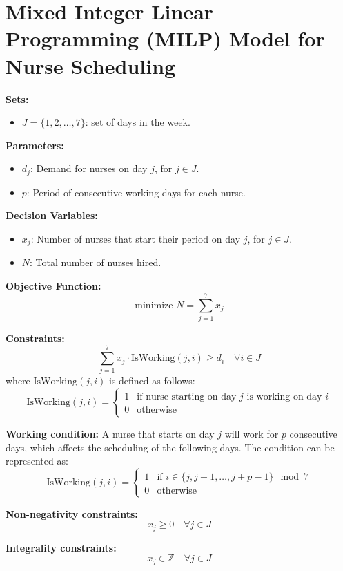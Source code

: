 \documentclass{article}
\begin{document}
\section*{Mixed Integer Linear Programming (MILP) Model for Nurse Scheduling}

\textbf{Sets:}
\begin{itemize}
    \item $J = \{1, 2, \ldots, 7\}$: set of days in the week.
\end{itemize}

\textbf{Parameters:}
\begin{itemize}
    \item $d_j$: Demand for nurses on day $j$, for $j \in J$.
    \item $p$: Period of consecutive working days for each nurse.
\end{itemize}

\textbf{Decision Variables:}
\begin{itemize}
    \item $x_j$: Number of nurses that start their period on day $j$, for $j \in J$.
    \item $N$: Total number of nurses hired.
\end{itemize}

\textbf{Objective Function:}
\begin{equation}
\text{minimize } N = \sum_{j=1}^{7} x_j
\end{equation}

\textbf{Constraints:}
\begin{equation}
\sum_{j=1}^{7} x_j \cdot \text{IsWorking}(j, i) \geq d_i \quad \forall i \in J
\end{equation}
where $\text{IsWorking}(j, i)$ is defined as follows:
\[
\text{IsWorking}(j, i) =
\begin{cases}
1 & \text{if nurse starting on day } j \text{ is working on day } i \\
0 & \text{otherwise}
\end{cases}
\]

\textbf{Working condition:}
A nurse that starts on day $j$ will work for $p$ consecutive days, which affects the scheduling of the following days. The condition can be represented as:
\[
\text{IsWorking}(j, i) = 
\begin{cases}
1 & \text{if } i \in \{j, j+1, \ldots, j+p-1\} \mod 7\\
0 & \text{otherwise}
\end{cases}
\]

\textbf{Non-negativity constraints:}
\begin{equation}
x_j \geq 0 \quad \forall j \in J
\end{equation}

\textbf{Integrality constraints:}
\begin{equation}
x_j \in \mathbb{Z} \quad \forall j \in J
\end{equation}
\end{document}
